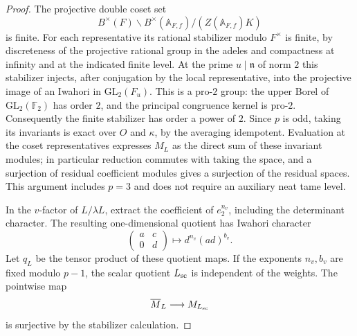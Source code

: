\begin{proof}
The projective double coset set
\[
 B^\times(F)\backslash B^\times(\mathbb A_{F,f})/
       (Z(\mathbb A_{F,f})K)
\]
is finite. For each representative its rational stabilizer modulo
\(F^\times\) is finite, by discreteness of the projective rational
group in the adeles and compactness at infinity and at the indicated
finite level. At the prime \(u\mid\mathfrak n\) of norm \(2\) this
stabilizer injects, after conjugation by the local representative,
into the projective image of an Iwahori in
\(\mathrm{GL}_2(F_u)\). This is a pro-\(2\) group: the upper
Borel of \(\mathrm{GL}_2(\mathbb F_2)\) has order \(2\), and the
principal congruence kernel is pro-\(2\).
Consequently the finite stabilizer has order a power of \(2\).
Since \(p\) is odd, taking its invariants is exact over \(O\)
and \(\kappa\), by the averaging idempotent. Evaluation at the
coset representatives expresses \(M_L\) as the direct sum of these
invariant modules; in particular reduction commutes with taking
the space, and a surjection of residual coefficient modules gives
a surjection of the residual spaces. This argument includes
\(p=3\) and does not require an auxiliary neat tame level.

In the \(v\)-factor of \(L/\lambda L\), extract the coefficient of
\(e_2^{n_v}\), including the determinant character. The resulting
one-dimensional quotient has Iwahori character
\[
 \begin{pmatrix}a&c\\0&d\end{pmatrix}
   \longmapsto d^{n_v}(ad)^{b_v}.
\]
Let \(q_L\) be the tensor product of these quotient maps. If the
exponents \(n_v,b_v\) are fixed modulo \(p-1\), the scalar quotient
\(L_{\rm sc}\) is independent of the weights. The pointwise map
\[
 \overline M_L\longrightarrow M_{L_{\rm sc}}
\]
is surjective by the stabilizer calculation.


\end{proof}
